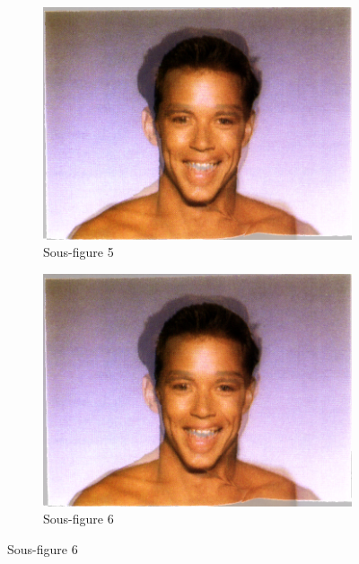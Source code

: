 \begin{figure}[h!]
    \begin{subfigure}{0.45\textwidth}
        \includegraphics[width=\textwidth]{img/testvisuel/frame4.png}
        \caption{Sous-figure 5}
    \end{subfigure}
    \hfill
    \begin{subfigure}{0.45\textwidth}
        \includegraphics[width=\textwidth]{img/testvisuel/frame5.png}
        \caption{Sous-figure 6}
    \end{subfigure}
    

\end{figure}
